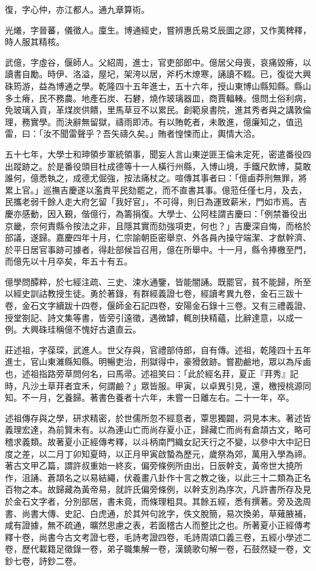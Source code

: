 \begin{pinyinscope}
復，字心仲，亦江都人。通九章算術。

光爔，字晉蕃，儀徵人。廩生。博通經史，嘗辨惠氏易爻辰圖之謬，又作荑稗釋，時人服其精核。

武億，字虛谷，偃師人。父紹周，進士，官吏部郎中。億居父母喪，哀痛毀瘠，以讀書自勵。時伊、洛溢，屋圮，架洿以居，斧朽木燎寒，誦讀不輟。已，復從大興硃筠游，益為博通之學。乾隆四十五年進士，五十六年，授山東博山縣知縣。縣山多土瘠，民不務農。地產石炭、石礬，燒作玻璃器皿，商賈輻輳。億問土俗利病，免玻璃入貢，革煤炭供饋，里馬草豆不以累民。創範泉書院，進其秀者與之講敦倫理，務實學。而決辭無留獄，禱雨即沛。有以賄乾者，未敢進，億廉知之，值迅雷，曰：「汝不聞雷聲乎？吾矢禱久矣。」賄者惶悚而止，輿情大洽。

五十七年，大學士和珅領步軍統領事，聞妄人言山東逆匪王倫未定死，密遣番役四出蹤跡之。於是番役頭目杜成德等十一人橫行州縣，入博山境，手鐵尺飲博，莫敢誰何，億悉執之，成德尤倔強，按法痛杖之。喧傳其事者曰：「億鹵莽刑無罪，將累上官。」巡撫吉慶遂以濫責平民劾罷之，而不直書其事。億蒞任僅七月，及去，民攜老弱千餘人走大府乞留「我好官」，不可得，則日為運致薪米，門如市焉。吉慶亦感動，因入覲，偕億行，為籌捐復。大學士、公阿桂謂吉慶曰：「例禁番役出京畿，奈何責縣令按法之非，且隱其實而劾強項吏，何也？」吉慶深自悔，而格於部議，遂歸。嘉慶四年十月，仁宗諭朝臣密舉京、外各員內操守端潔、才猷幹濟、於平日居官事跡可據者，得赴部候旨召用，億在所舉中。十一月，縣令捧檄至門，而億先以十月卒矣，年五十有五。

億學問醰粹，於七經注疏、三史、涑水通鑒，皆能闇誦。既罷官，貧不能歸，所至以經史訓詁教授生徒。勇於著錄，有群經義證七卷，經讀考異九卷，金石三跋十卷，金石文字續跋十四卷，偃師金石記四卷，安陽金石錄十三卷。又有三禮義證、授堂劄記、詩文集等書，皆旁引遠徵，遇微罅，輒剖抉精蘊，比辭達意，以成一例。大興硃珪稱億不愧好古遺直云。

莊述祖，字葆琛，武進人。世父存與，官禮部侍郎，自有傳。述祖，乾隆四十五年進士，官山東濰縣知縣。明暢吏治，刑獄得中，豪猾斂跡。嘗勘鹼地，眾以為斥鹵也，述祖指路旁草問何名，曰馬帚。述祖笑曰：「此於經名荓，夏正『荓秀』記時，凡沙土草荓者宜禾，何謂鹼？」眾皆服。甲寅，以卓異引見，還，檄授桃源同知。不一月，乞養歸。著書色養者十六年，未嘗一日離左右。二十一年，卒。

述祖傳存與之學，研求精密，於世儒所忽不經意者，覃思獨闢，洞見本末。著述皆義理宏達，為前賢未有。以為連山亡而尚存夏小正，歸藏亡而尚有倉頡古文，略可稽求義類。故著夏小正經傳考釋，以斗柄南門織女記天行之不變，以參中大中記日度之差，以二月丁卯知夏時，以正月甲寅啟蟄為歷元，歲祭為郊，萬用入學為禘。著古文甲乙篇，謂許叔重始一終亥，偏旁條例所由出，日辰幹支，黃帝世大撓所作，沮誦、蒼頡名之以易結繩，伏羲畫八卦作十言之教之後，以此三十二類為正名百物之本。故歸藏為黃帝易，就許氏偏旁條例，以幹支別為序次，凡許書所存及見於金石文字者，分別部居，書未竟，而條理粗具。其餘五經，悉有撰著。旁及逸周書、尚書大傳、史記、白虎通，於其舛句訛字，佚文脫簡，易次換弟，草薙腋補，咸有證據，無不疏通，曠然思慮之表，若面稽古人而整比之也。所著夏小正經傳考釋十卷，尚書今古文考證七卷，毛詩考證四卷，毛詩周頌口義三卷，五經小學述二卷，歷代載籍足徵錄一卷，弟子職集解一卷，漢鐃歌句解一卷，石鼓然疑一卷，文鈔七卷，詩鈔二卷。


\end{pinyinscope}
